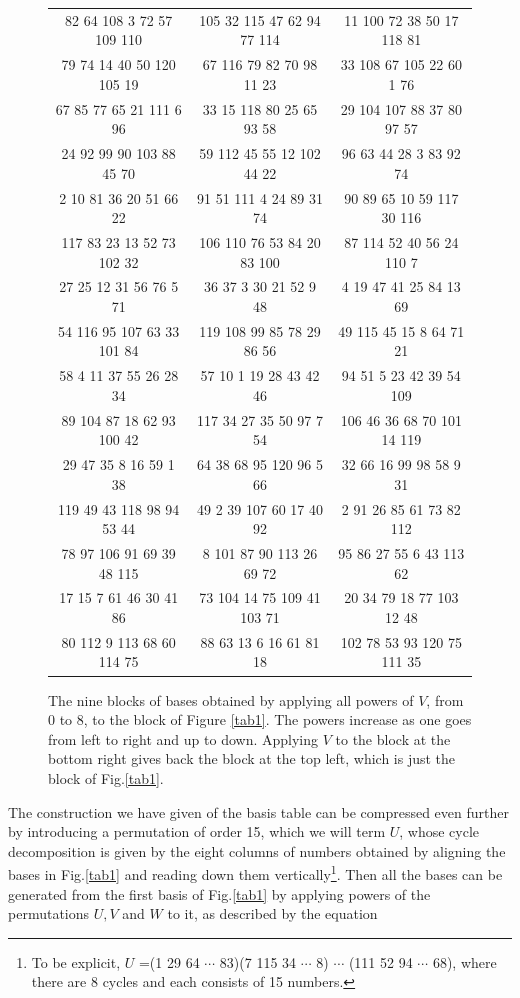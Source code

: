 \begin{figure}[h!]
\centering %
\begin{tabular}{|c | c |c |} %
\hline %
82	64	108	3	72	57	109	110&105	32	115	47	62	94	77	114&11	100	72	38	50	17	118	81\\
79	74	14	40	50	120	105	19&	67	116	79	82	70	98	11	23&	33	108	67	105	22	60	1	76\\
67	85	77	65	21	111	6	96&	33	15	118	80	25	65	93	58&	29	104	107	88	37	80	97	57\\
24	92	99	90	103	88	45	70&	59	112	45	55	12	102	44	22&	96	63	44	28	3	83	92	74\\
2	10	81	36	20	51	66	22&	91	51	111	4	24	89	31	74&	90	89	65	10	59	117	30	116\\
117	83	23	13	52	73	102	32&	106	110	76	53	84	20	83	100&87	114	52	40	56	24	110	7\\
27	25	12	31	56	76	5	71&	36	37	3	30	21	52	9	48&	4	19	47	41	25	84	13	69\\
54	116	95	107	63	33	101	84&	119	108	99	85	78	29	86	56&	49	115	45	15	8	64	71	21\\
58	4	11	37	55	26	28	34&	57	10	1	19	28	43	42	46&	94	51	5	23	42	39	54	109\\
89	104	87	18	62	93	100	42&	117	34	27	35	50	97	7	54&	106	46	36	68	70	101	14	119\\
29	47	35	8	16	59	1	38&	64	38	68	95	120	96	5	66&	32	66	16	99	98	58	9	31\\
119	49	43	118	98	94	53	44&	49	2	39	107	60	17	40	92&	2	91	26	85	61	73	82	112\\
78	97	106	91	69	39	48	115&8	101	87	90	113	26	69	72&	95	86	27	55	6	43	113	62\\
17	15	7	61	46	30	41	86&	73	104	14	75	109	41	103	71&	20	34	79	18	77	103	12	48\\
80	112	9	113	68	60	114	75&	88	63	13	6	16	61	81	18&	102	78	53	93	120	75	111	35\\
\hline
\end{tabular}
\caption{The nine blocks of bases obtained by applying all powers of $V$, from 0 to 8, to the block of Figure \ref{tab1}. The powers increase as one goes from left to right and up to down. Applying $V$ to the block at the bottom right gives back the block at the top left, which is just the block of Fig.\ref{tab1}.}
\label{tab2}
\end{figure}

The construction we have given of the basis table can be compressed even further by introducing a permutation of order 15, which we will term $U$, whose cycle decomposition is given by the eight columns of numbers obtained by aligning the bases in Fig.\ref{tab1} and reading down them vertically\footnote{To be explicit, $U$ =(1 29 64 $\cdots$ 83)(7 115 34 $\cdots$ 8) $\cdots$ (111 52 94 $\cdots$ 68), where there are 8 cycles and each consists of 15 numbers.}. Then all the bases can be generated from the first basis of Fig.\ref{tab1} by applying powers of the permutations $U,V$ and $W$ to it, as described by the equation

